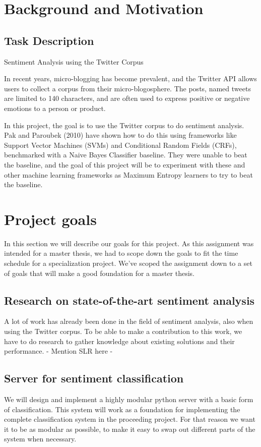 \section{Background and Motivation}
	\subsection{Task Description}

\begin{center} \Large Sentiment Analysis using the Twitter Corpus \end{center}
\begin{normalsize}
In recent years, micro-blogging has become prevalent, and the Twitter API allows users to collect a corpus from their micro-blogosphere. The posts, named tweets are limited to 140 characters, and are often used to express positive or negative emotions to a person or product.

In this project, the goal is to use the Twitter corpus to do sentiment analysis. Pak and Paroubek (2010) have shown how to do this using frameworks like Support Vector Machines (SVMs) and Conditional Random Fields (CRFs), benchmarked with a Naive Bayes Classifier baseline. They were unable to beat the baseline, and the goal of this project will be to experiment with these and other machine learning frameworks as Maximum Entropy learners to try to beat the baseline.
\end{normalsize}

\section{Project goals}
In this section we will describe our goals for this project. As this assignment was intended for a master thesis, we had to scope down the goals to fit the time schedule for a specialization project. We've scoped the assignment down to a set of goals that will make a good foundation for a master thesis.

	\subsection{Research on state-of-the-art sentiment analysis}
	A lot of work has already been done in the field of sentiment analysis, also when using the Twitter corpus. To be able to make a contribution to this work, we have to do research to gather knowledge about existing solutions and their performance. - Mention SLR here -

	\subsection{Server for sentiment classification}
	We will design and implement a highly modular python server with a basic form of classification. This system will work as a foundation for implementing the complete classification system in the proceeding project. For that reason we want it to be as modular as possible, to make it easy to swap out different parts of the system when necessary.

